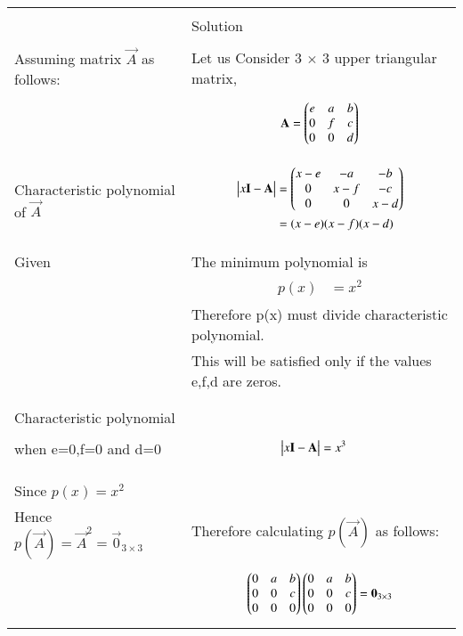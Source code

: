 \onecolumn
\begin{longtable}{|l|l|}
\hline
\multirow{3}{*}{} & \\
Statement&Solution\\
\hline
&\\
Assuming matrix $\vec{A}$ as follows:&Let us Consider 3 $\times$ 3 upper triangular matrix,\\
&\parbox{6cm}{\begin{align*}
    \mathbf{A}=\begin{pmatrix}e&a&b\\0&f&c\\0&0&d\end{pmatrix}
\end{align*}}\\
\hline
Characteristic polynomial of $\vec{A}$&
\parbox{6cm}{\begin{align*}
    \begin{vmatrix}x\mathbf{I}-\mathbf{A}\end{vmatrix}&=\begin{pmatrix}x-e&-a&-b\\0&x-f&-c\\0&0&x-d\end{pmatrix}\\
    &=(x-e)(x-f)(x-d)
\end{align*}}\\
\hline
&\\
Given&The minimum polynomial is\\
&\parbox{6cm}{\begin{align*}
    p(x)&=x^2
\end{align*}}\\
&Therefore p(x) must divide characteristic polynomial.\\
&This will be satisfied only if the values e,f,d are zeros.\\
&\\
\hline
&\\
Characteristic polynomial&\\
when e=0,f=0 and d=0&\parbox{6cm}{\begin{align*}
    \begin{vmatrix}x\mathbf{I}-\mathbf{A}\end{vmatrix}&=x^3
\end{align*}}\\
&\\
\hline
&\\
Since $p(x)=x^2$&\\
Hence $ p(\vec{A})=\vec{A}^2=\vec{0}_{3\times3}$&Therefore calculating $p(\vec{A})$ as follows:\\
&\parbox{6cm}{\begin{align*}
    \myvec{0&a&b\\0&0&c\\0&0&0} \myvec{0&a&b\\0&0&c\\0&0&0}&=\vec{0}_{3\times3}\\

\end{align*}}
\end{longtable}
